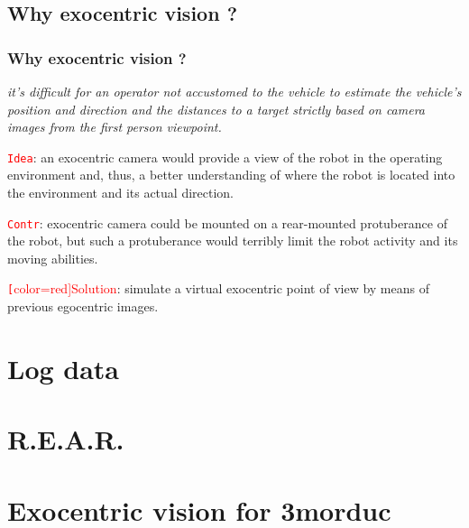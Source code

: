 \documentclass[slidestop,compress,mathserif,note=show, blackandwhite]{beamer}
\begin{document}
\subsection{Why exocentric vision ?}
\frame
{
  \frametitle{Why exocentric vision ?}
  \textit{it's difficult for an operator not accustomed to the vehicle
    to estimate the vehicle's position and direction and the distances to a target strictly
    based on camera images from the first person viewpoint.}
  \pause
  \vspace {1.0cm}
 
  \textcolor{red}{\texttt{Idea}}: an exocentric camera would provide a view of the robot in the operating
  environment and, thus, a better understanding of where the robot is located into the
  environment and its actual direction. \\
  \pause
  \vspace {1.0cm}
  
  \textcolor{red}{\texttt{Contr}}: exocentric camera could be mounted on a rear-mounted protuberance of the robot,
  but such a protuberance would terribly limit the robot activity and its moving abilities.
  \pause
  \vspace {1.0cm}

  \textcolor{red}{\texttt[color=red]{Solution}}: simulate a virtual exocentric point of view by means of previous egocentric
  images.

}


\section{Log data}

\section{R.E.A.R.}

\section{Exocentric vision for 3morduc}
\end{document}
